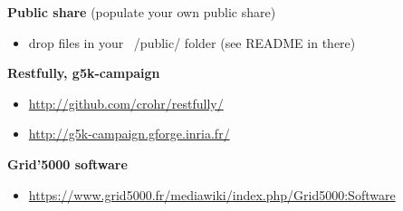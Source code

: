 \textbf{Public share} (populate your own public share)
\begin{itemize}
\item drop files in your ~/public/ folder (see README in there)
\end{itemize}

\textbf{Restfully, g5k-campaign}
\begin{itemize}
\item \url{http://github.com/crohr/restfully/}
\item \url{http://g5k-campaign.gforge.inria.fr/}
\end{itemize}

\textbf{Grid'5000 software}
\begin{itemize}
\item \url{https://www.grid5000.fr/mediawiki/index.php/Grid5000:Software}
\end{itemize}%